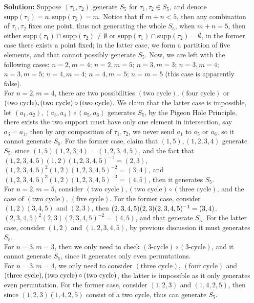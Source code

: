 \documentclass[12pt]{article}
\begin{document}
\textbf{Solution:} Suppose $(\tau_{1},\tau_{2})$ generate $S_5$ for $\tau_{1},\tau_{2}\in S_{5}$, and denote $\text{supp}(\tau_{1})=n,\text{supp}(\tau_{2})=m$. Notice that if $m+n<5$, then any combination of $\tau_{1},\tau_{2}$ fixes one point, thus not generating the whole $S_{5}$, when $m+n=5$, then either $\text{supp}(\tau_{1})\cap\text{supp}(\tau_{2})\neq \emptyset$ or $\text{supp}(\tau_{1})\cap\text{supp}(\tau_{2})=\emptyset$, in the former case there exists a point fixed; in the latter case, we form a partition of five elements, and that cannot possibly generate $S_5$. Now, we are left with the following cases: $n=2, m=4$; $n=2, m=5$; $n=3, m=3$; $n=3, m=4$; $n=3, m=5$; $n=4, m=4$; $n=4, m=5$; $n=m=5$ (this case is apparently false). \\
\indent For $n=2,m=4$, there are two possibilities $(\text{two cycle}), (\text{four cycle})$ or $(\text{two cycle}), \\ (\text{two cycle}) \circ(\text{two cycle})$. We claim that the latter case is impossible, let $(a_{1}, a_{2}), (a_{3}, a_{4})\circ(a_{5}, a_{6})$ generates $S_5$, by the Pigeon Hole Principle, there exists the two support must have only one element in intersection, say $a_{3}=a_{1}$, then by any composition of $\tau_{1},\tau_{2}$, we never send $a_{1}$ to $a_{5}$ or $a_{6}$, so it cannot generate $S_{5}$. For the former case, claim that $(1,5), (1,2,3,4)$ generate $S_5$, since $(1, 5)(1, 2, 3, 4)=(1, 2, 3, 4, 5)$, and the fact that $(1, 2, 3, 4, 5)(1, 2)(1, 2, 3, 4, 5)^{-1}=(2,3)$, $(1, 2, 3, 4, 5)^{2}(1, 2)(1, 2, 3, 4, 5)^{-2}=(3, 4)$, and $(1, 2, 3, 4, 5)^{3}(1, 2)(1, 2, 3, 4, 5)^{-3}=(4, 5)$, then it generates $S_5$. \\
\indent For $n=2,m=5$, consider $(\text{two cycle}), (\text{two cycle})\circ(\text{three cycle})$, and the case of $(\text{two cycle})$, $(\text{five cycle})$. For the former case, consider $(1, 2)(3, 4, 5)$ and $(2, 3)$, then $(2, 3, 4, 5) \\(2, 3)(2, 3, 4, 5)^{-1}=(3, 4)$, $(2, 3, 4, 5)^{2}(2, 3)(2, 3, 4, 5)^{-2}=(4, 5)$, and that generate $S_{5}$. For the latter case, consider $(1, 2)$ and $(1, 2, 3, 4, 5)$, by previous discussion it must generates $S_{5}$. \\
\indent For $n=3, m=3$, then we only need to check $(\text{3-cycle})\circ(\text{3-cycle})$, and it cannot generate $S_5$, since it generates only even permutations. \\
\indent For $n=3, m=4$, we only need to consider $(\text{three cycle})$, $(\text{four cycle})$ and $(\text{three cycle}), \\ (\text{two cycle})\circ(\text{two cycle})$, the latter is impossible as it only generates even permutation. For the former case, consider $(1, 2, 3)$ and $(1,4,2,5)$, then since $(1, 2, 3)(1, 4, 2, 5)$ consist of a two cycle, thus can generate $S_5$. \\
\end{document}
